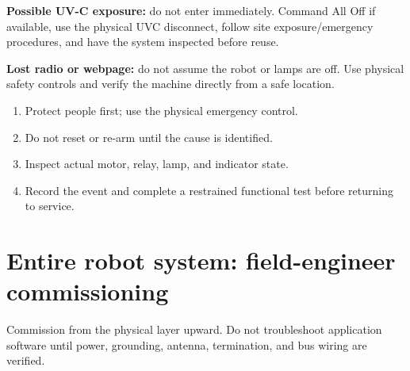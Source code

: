 \documentclass[
  10pt,
  letterpaper,
  openany]{report}
\providecommand{\tightlist}{%
  \setlength{\itemsep}{0pt}\setlength{\parskip}{0pt}}
\begin{document}
\begin{manualdanger}

\textbf{Possible UV-C exposure:} do not enter immediately. Command All
Off if available, use the physical UVC disconnect, follow site
exposure/emergency procedures, and have the system inspected before
reuse.

\end{manualdanger}

\begin{manualwarning}

\textbf{Lost radio or webpage:} do not assume the robot or lamps are
off. Use physical safety controls and verify the machine directly from a
safe location.

\end{manualwarning}

\begin{enumerate}
\tightlist
\item
  Protect people first; use the physical emergency control.
\item
  Do not reset or re-arm until the cause is identified.
\item
  Inspect actual motor, relay, lamp, and indicator state.
\item
  Record the event and complete a restrained functional test before
  returning to service.
\end{enumerate}

\protect{}\label{system-engineer}
\section{Entire robot system: field-engineer
commissioning}\label{entire-robot-system-field-engineer-commissioning}

Commission from the physical layer upward. Do not troubleshoot
application software until power, grounding, antenna, termination, and
bus wiring are verified.
\end{document}
